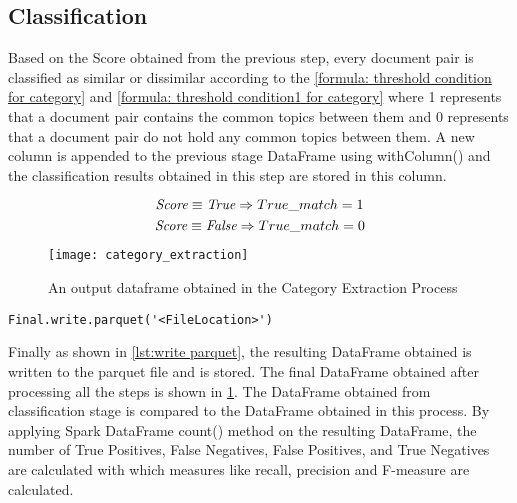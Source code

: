 \subsection{Classification} 
Based on the Score obtained from the previous step, every document pair is classified as similar or dissimilar according to the \ref{formula: threshold condition for category} and \ref{formula: threshold condition1 for category} where 1 represents that a document pair contains the common topics between them and 0 represents that a document pair do not hold any common topics between them. A new column is appended to the previous stage DataFrame using withColumn() and the classification results obtained in this step are stored in this column.

\begin{equation}\label{formula: threshold condition for category}
\textit{Score}   \equiv  \textit{True}  \Rightarrow True\char`_match = 1
\end{equation}
\begin{equation}\label{formula: threshold condition1 for category}
\textit{Score}  \equiv  \textit{False}  \Rightarrow True\char`_match = 0
\end{equation}


\begin{figure}[htbp]
	\centering
		\texttt{[image: category\_extraction]}
	\caption{An output dataframe obtained in the Category Extraction Process }
	\label{fig: category_extraction}
\end{figure}

\begin{lstlisting}[style=Java,float=htb,caption={Python Code for writing resulting DataFrame to parquet Format},label={lst:write parquet}]
Final.write.parquet('<FileLocation>')
\end{lstlisting}

\newpage
Finally as shown in \ref{lst:write parquet}, the resulting DataFrame obtained is written to the parquet file and is stored. The final DataFrame obtained after processing all the steps is shown in \ref{fig: category_extraction}. The DataFrame obtained from classification stage is compared to the DataFrame obtained in this process. By applying Spark DataFrame count() method on the resulting DataFrame, the number of True Positives, False Negatives, False Positives, and True Negatives are calculated with which measures like recall, precision and F-measure are calculated.










